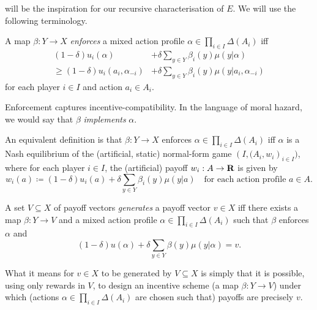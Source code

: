  will be the inspiration for our recursive characterisation of $E$. We will use the following terminology.

\begin{definition}
	\label{definition:enforcement}
	A map $\beta : Y \to X$ \emph{enforces} a mixed action profile $\alpha \in \prod_{i \in I} \Delta(A_i)$ iff
	\begin{align*}
		(1-\delta) u_i(\alpha) &+ \delta \sum_{y \in Y} \beta_i(y) \mu(y|\alpha)
		\\
		\geq (1-\delta) u_i(a_i,\alpha_{-i}) &+ \delta \sum_{y \in Y} \beta_i(y) \mu(y|a_i,\alpha_{-i})
	\end{align*}
	for each player $i \in I$ and action $a_i \in A_i$.
\end{definition}

Enforcement captures incentive-compatibility. In the language of moral hazard, we would say that $\beta$ \emph{implements} $\alpha$.

\begin{remark}
	\label{remark:enforc_nash}
	An equivalent definition is that $\beta : Y \to X$ enforces $\alpha \in \prod_{i \in I} \Delta(A_i)$ iff $\alpha$ is a Nash equilibrium of the (artificial, static) normal-form game $\left(I,(A_i,w_i\right)_{i \in I})$, where for each player $i \in I$, the (artificial) payoff $w_i : A \to \mathbf{R}$ is given by
	\begin{equation*}
		w_i(a) \coloneqq (1-\delta) u_i(a) + \delta \sum_{y \in Y} \beta_i(y) \mu(y|a)
		\quad \text{for each action profile $a \in A$.}
	\end{equation*}
\end{remark}

\begin{definition}
	\label{definition:generation}
	A set $V \subseteq X$ of payoff vectors \emph{generates} a payoff vector $v \in X$ iff there exists a map $\beta : Y \to V$ and a mixed action profile $\alpha \in \prod_{i \in I} \Delta(A_i)$ such that $\beta$ enforces $\alpha$ and
	\begin{equation*}
		(1-\delta) u(\alpha)
		+ \delta \sum_{y \in Y} \beta(y) \mu(y|\alpha) 
		= v.
	\end{equation*}
\end{definition}

What it means for $v \in X$ to be generated by $V \subseteq X$ is simply that it is possible, using only rewards in $V$, to design an incentive scheme (a map $\beta : Y \to V$) under which (actions $\alpha \in \prod_{i \in I} \Delta(A_i)$ are chosen such that) payoffs are precisely $v$.

